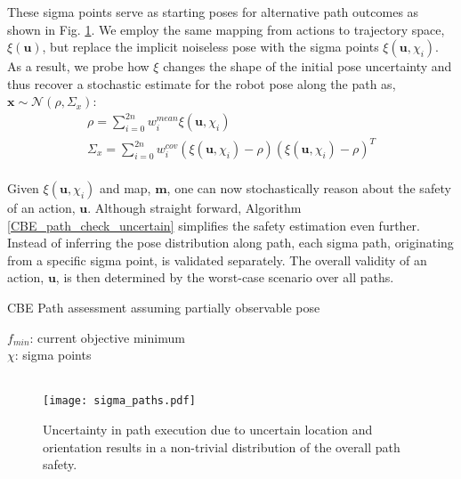 \documentclass[shortAfour,sageh,times]{sagej_no_sage}
\newlength\mylen
\newcommand\myinput[1]{%
  \settowidth\mylen{\KwIn{}}%
  \setlength\hangindent{\mylen}%
  \hspace*{\mylen}#1\\}
\begin{document}
These sigma points serve as starting poses for alternative path outcomes as shown in Fig. \ref{fig:sigma_paths}. We employ the same mapping from actions to trajectory space, $\xi(\boldsymbol{u})$, but replace the implicit noiseless pose with the sigma points $\xi(\boldsymbol{u},\chi_i)$. As a result, we probe how $\xi$ changes the shape of the initial pose uncertainty and thus recover a stochastic estimate for the robot pose along the path as, $\boldsymbol{x} \sim \mathcal{N}(\rho,\Sigma_{x})$:
\begin{equation}\label{eq:sigma_pred_mean}
\begin{aligned}
& \rho = \sum_{i=0}^{2n} w^{mean}_i\xi(\boldsymbol{u},\chi_i) &\\
& \Sigma_{x} =  \sum_{i=0}^{2n} w^{cov}_i(\xi(\boldsymbol{u},\chi_i)-\rho)(\xi(\boldsymbol{u},\chi_i)-\rho)^T &\\
\end{aligned}
\end{equation}
 
Given $\xi(\boldsymbol{u},\chi_i)$ and map, $\boldsymbol{m}$, one can now stochastically reason about the safety of an action, $\boldsymbol{u}$. Although straight forward, Algorithm \ref{CBE_path_check_uncertain} simplifies the safety estimation even further. Instead of inferring the pose distribution along path, each sigma path, originating from a specific sigma point, is validated separately. The overall validity of an action, $\boldsymbol{u}$, is then determined by the worst-case scenario over all paths. 
 
\begin{algorithm}[bt]
	\caption{CBE Path assessment assuming partially observable pose}
	\label{CBE_path_check_uncertain}
	\myinput{$f_{min}$: current objective minimum}
	\myinput{$\chi$: sigma points}
	\
	\DontPrintSemicolon
	
\end{algorithm}
 
\begin{figure}[bthp]
	
	\centering
	
	\texttt{[image: sigma\_paths.pdf]}
	
	\caption{Uncertainty in path execution due to uncertain location and orientation results in a non-trivial distribution of the overall path safety.}
	\label{fig:sigma_paths}
\end{figure}
\end{document}
